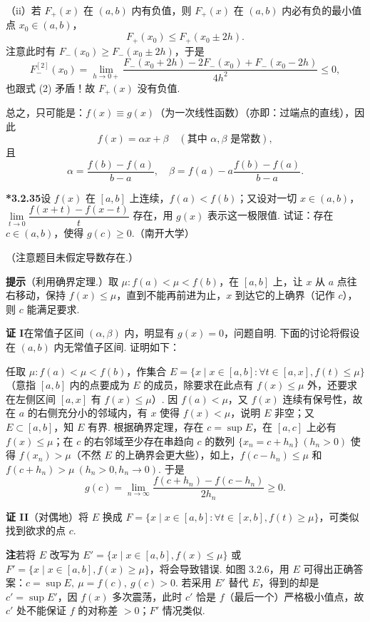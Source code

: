 \documentclass[UTF8,12pt,a4paper,fontset=fandol]{ctexart}
\begin{document}
（ii）若 $F_+(x)$ 在 $(a,b)$ 内有负值，则 $F_+(x)$ 在 $(a,b)$ 内必有负的最小值点 $x_0\in(a,b)$，
\[
  F_+(x_0)\le F_+(x_0\pm2h).
\]
注意此时有 $F_-(x_0)\ge F_-(x_0\pm2h)$，于是
\[
  F_-^{[2]}(x_0)
  =
  \lim_{h\to0+}
  \frac{F_-(x_0+2h)-2F_-(x_0)+F_-(x_0-2h)}{4h^2}
  \le0,
\]
也跟式 (2) 矛盾！故 $F_+(x)$ 没有负值.

总之，只可能是：$f(x)\equiv g(x)$（为一次线性函数）（亦即：过端点的直线），因此
\[
  f(x)=\alpha x+\beta\quad(\text{其中 }\alpha,\beta\text{ 是常数}),
\]
且
\[
  \alpha=\frac{f(b)-f(a)}{b-a},\quad
  \beta=f(a)-a\frac{f(b)-f(a)}{b-a}.
\]

\noindent\textbf{*3.2.35}\quad 设 $f(x)$ 在 $[a,b]$ 上连续，$f(a)<f(b)$；又设对一切 $x\in(a,b)$，$\lim\limits_{t\to0}\dfrac{f(x+t)-f(x-t)}t$ 存在，用 $g(x)$ 表示这一极限值. 试证：存在 $c\in(a,b)$，使得 $g(c)\ge0$.（南开大学）

（注意题目未假定导数存在.）

\noindent\textbf{提示}\quad （利用确界定理.）取 $\mu:f(a)<\mu<f(b)$，在 $[a,b]$ 上，让 $x$ 从 $a$ 点往右移动，保持 $f(x)\le\mu$，直到不能再前进为止，$x$ 到达它的上确界（记作 $c$），则 $c$ 能满足要求.

\noindent\textbf{证 I}\quad 在常值子区间 $(\alpha,\beta)$ 内，明显有 $g(x)=0$，问题自明. 下面的讨论将假设在 $(a,b)$ 内无常值子区间. 证明如下：

任取 $\mu:f(a)<\mu<f(b)$，作集合 $E=\{x\mid x\in[a,b]:\forall t\in[a,x],f(t)\le\mu\}$（意指 $[a,b]$ 内的点要成为 $E$ 的成员，除要求在此点有 $f(x)\le\mu$ 外，还要求在左侧区间 $[a,x]$ 有 $f(x)\le\mu$）. 因 $f(a)<\mu$，又 $f(x)$ 连续有保号性，故在 $a$ 的右侧充分小的邻域内，有 $x$ 使得 $f(x)<\mu$，说明 $E$ 非空；又 $E\subset[a,b]$，知 $E$ 有界. 根据确界定理，存在 $c=\sup E$，在 $[a,c]$ 上必有 $f(x)\le\mu$；在 $c$ 的右邻域至少存在串趋向 $c$ 的数列 $\{x_n=c+h_n\}\ (h_n>0)$ 使得 $f(x_n)>\mu$（不然 $E$ 的上确界会更大些），如上，$f(c-h_n)\le\mu$ 和 $f(c+h_n)>\mu\ (h_n>0,h_n\to0)$. 于是
\[
  g(c)=\lim_{n\to\infty}\frac{f(c+h_n)-f(c-h_n)}{2h_n}\ge0.
\]

\noindent\textbf{证 II}\quad （对偶地）将 $E$ 换成 $F=\{x\mid x\in[a,b]:\forall t\in[x,b],f(t)\ge\mu\}$，可类似找到欲求的点 $c$.

\noindent\textbf{注}\quad 若将 $E$ 改写为 $E'=\{x\mid x\in[a,b],f(x)\le\mu\}$ 或 $F'=\{x\mid x\in[a,b],f(x)\ge\mu\}$，将会导致错误. 如图 3.2.6，用 $E$ 可得出正确答案：$c=\sup E,\ \mu=f(c),\ g(c)>0$. 若采用 $E'$ 替代 $E$，得到的却是 $c'=\sup E'$，因 $f(x)$ 多次震荡，此时 $c'$ 恰是 $f$（最后一个）严格极小值点，故 $c'$ 处不能保证 $f$ 的对称差 $>0$；$F'$ 情况类似.
\end{document}
